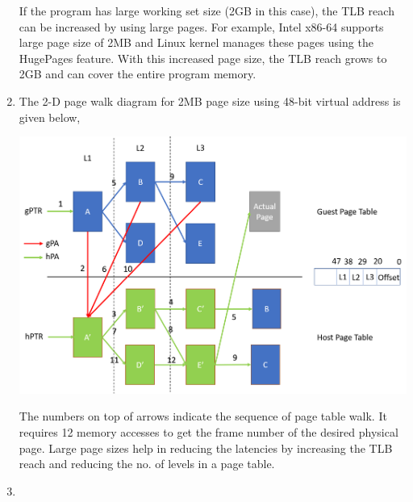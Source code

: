 \documentclass[11pt,a4paper,oneside]{article}
\begin{document}
\begin{enumerate}
		If the program has large working set size (2GB in this case), the TLB reach can be increased by using large pages. For example, Intel x86-64 supports large page size of 2MB and Linux kernel manages these pages using the HugePages feature. With this increased page size, the TLB reach grows to 2GB and can cover the entire program memory. 
		\item The 2-D page walk diagram for 2MB page size using 48-bit virtual address is given below,
		 \begin{center}
		   \includegraphics[scale=0.6]{1.png}
		\end{center}
	    The numbers on top of arrows indicate the sequence of page table walk. It requires 12 memory accesses to get the frame number of the desired physical page. Large page sizes help in reducing the latencies by increasing the TLB reach and reducing the no. of levels in a page table.
		\item
		
	
		
		    
	        			
	\end{enumerate}
    
\end{document}
